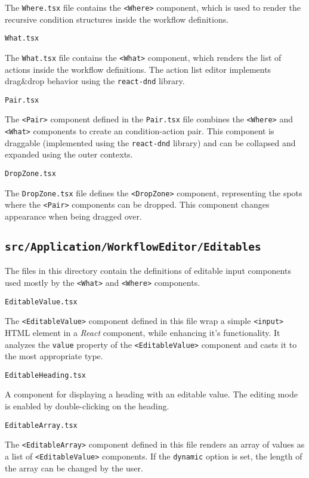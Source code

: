 The \texttt{Where.tsx} file contains the \texttt{<Where>} component, which is used to render the recursive condition structures inside the workflow definitions.

\emptyline
\verb|What.tsx|
\smallskip

The \texttt{What.tsx} file contains the \texttt{<What>} component, which renders the list of actions inside the workflow definitions.
The action list editor implements drag\&drop behavior using the \texttt{react-dnd} library.

\emptyline
\verb|Pair.tsx|
\smallskip

The \texttt{<Pair>} component defined in the \texttt{Pair.tsx} file combines the \texttt{<Where>} and \texttt{<What>} components to create an condition-action pair.
This component is draggable (implemented using the \texttt{react-dnd} library) and can be collapsed and expanded using the outer contexts.

\emptyline
\verb|DropZone.tsx|
\smallskip

The \texttt{DropZone.tsx} file defines the \texttt{<DropZone>} component, representing the spots where the \texttt{<Pair>} components can be dropped.
This component changes appearance when being dragged over.

\subsection{\texttt{src/Application/WorkflowEditor/Editables}}

The files in this directory contain the definitions of editable input components used mostly by the \texttt{<What>} and \texttt{<Where>} components.

\emptyline
\verb|EditableValue.tsx|
\smallskip

The \texttt{<EditableValue>} component defined in this file wrap a simple \texttt{<input>} \acs{HTML} element in a \textit{React} component,
while enhancing it's functionality.
It analyzes the \texttt{value} property of the \texttt{<EditableValue>} component and casts it to the most appropriate type.

\emptyline
\verb|EditableHeading.tsx|
\smallskip

A component for displaying a heading with an editable value. The editing mode is enabled by double-clicking on the heading.

\emptyline
\verb|EditableArray.tsx|
\smallskip

The \texttt{<EditableArray>} component defined in this file renders an array of values as a list of \texttt{<EditableValue>} components.
If the \texttt{dynamic} option is set, the length of the array can be changed by the user.

